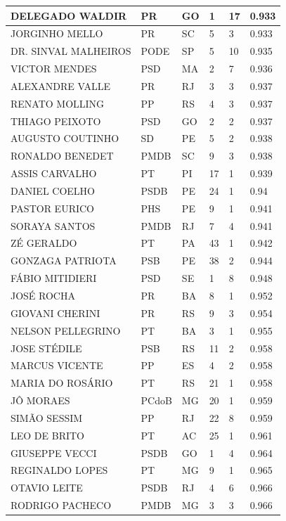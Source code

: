 \begin{apendicesenv}
\begin{longtable}{|L{4cm}|C{2cm}|C{1cm}|C{2cm}|C{1cm}|C{2cm}|}
DELEGADO WALDIR & PR & GO & 1 & 17 & 0.933 \\ \hline
JORGINHO MELLO & PR & SC & 5 & 3 & 0.933 \\ \hline
DR. SINVAL MALHEIROS & PODE & SP & 5 & 10 & 0.935 \\ \hline
VICTOR MENDES & PSD & MA & 2 & 7 & 0.936 \\ \hline
ALEXANDRE VALLE & PR & RJ & 3 & 3 & 0.937 \\ \hline
RENATO MOLLING & PP & RS & 4 & 3 & 0.937 \\ \hline
THIAGO PEIXOTO & PSD & GO & 2 & 2 & 0.937 \\ \hline
AUGUSTO COUTINHO & SD & PE & 5 & 2 & 0.938 \\ \hline
RONALDO BENEDET & PMDB & SC & 9 & 3 & 0.938 \\ \hline
ASSIS CARVALHO & PT & PI & 17 & 1 & 0.939 \\ \hline
DANIEL COELHO & PSDB & PE & 24 & 1 & 0.94 \\ \hline
PASTOR EURICO & PHS & PE & 9 & 1 & 0.941 \\ \hline
SORAYA SANTOS & PMDB & RJ & 7 & 4 & 0.941 \\ \hline
ZÉ GERALDO & PT & PA & 43 & 1 & 0.942 \\ \hline
GONZAGA PATRIOTA & PSB & PE & 38 & 2 & 0.944 \\ \hline
FÁBIO MITIDIERI & PSD & SE & 1 & 8 & 0.948 \\ \hline
JOSÉ ROCHA & PR & BA & 8 & 1 & 0.952 \\ \hline
GIOVANI CHERINI & PR & RS & 9 & 3 & 0.954 \\ \hline
NELSON PELLEGRINO & PT & BA & 3 & 1 & 0.955 \\ \hline
JOSE STÉDILE & PSB & RS & 11 & 2 & 0.958 \\ \hline
MARCUS VICENTE & PP & ES & 4 & 2 & 0.958 \\ \hline
MARIA DO ROSÁRIO & PT & RS & 21 & 1 & 0.958 \\ \hline
JÔ MORAES & PCdoB & MG & 20 & 1 & 0.959 \\ \hline
SIMÃO SESSIM & PP & RJ & 22 & 8 & 0.959 \\ \hline
LEO DE BRITO & PT & AC & 25 & 1 & 0.961 \\ \hline
GIUSEPPE VECCI & PSDB & GO & 1 & 4 & 0.964 \\ \hline
REGINALDO LOPES & PT & MG & 9 & 1 & 0.965 \\ \hline
OTAVIO LEITE & PSDB & RJ & 4 & 6 & 0.966 \\ \hline
RODRIGO PACHECO & PMDB & MG & 3 & 3 & 0.966 \\ \hline

\end{longtable}
\end{apendicesenv}
